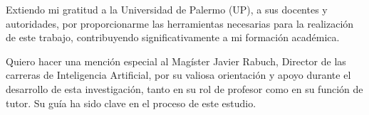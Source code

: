 Extiendo mi gratitud a la Universidad de Palermo (UP), a sus docentes y autoridades, por proporcionarme
las herramientas necesarias para la realización de este trabajo, contribuyendo significativamente a mi formación académica.

Quiero hacer una mención especial al Magíster Javier Rabuch, Director de las carreras de Inteligencia Artificial,
por su valiosa orientación y apoyo durante el desarrollo de esta investigación, tanto en su rol de profesor como
en su función de tutor. Su guía ha sido clave en el proceso de este estudio.
